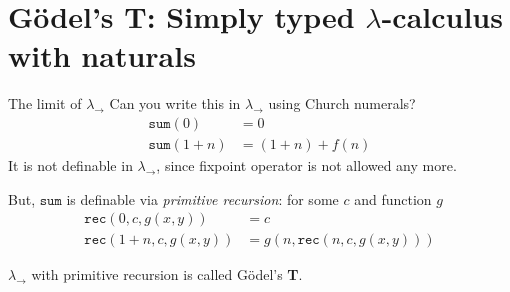 \section{G\"odel's \textbf{T}: Simply typed $\lambda$-calculus with naturals}
\begin{frame}{The limit of $\lambda_\to$}
  Can you write this in $\lambda_\to$ using Church numerals?
  \begin{align*}
    \mathtt{sum}(0)     & = 0 \\
    \mathtt{sum}(1 + n) & = (1 + n) + f(n)
  \end{align*}
  It is not definable in $\lambda_\to$, since fixpoint operator is not allowed any more. 

  But, $\mathtt{sum}$ is definable via \emph{primitive recursion}:
  for some $c$ and function $g$
  \begin{align*}
    \mathtt{rec}(0, c, g(x, y))       &= c \\
    \mathtt{rec}(1 + n, c, g(x, y))   &= g(n, \mathtt{rec}(n, c, g(x, y)))
  \end{align*}

  $\lambda_\to$ with primitive recursion is called G\"odel's \textbf{T}.
\end{frame}

